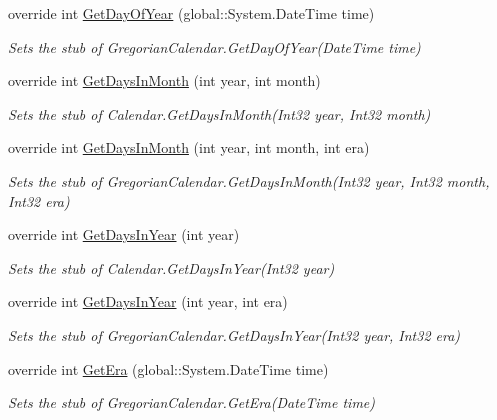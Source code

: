 \begin{DoxyCompactItemize}
override int \hyperlink{class_system_1_1_globalization_1_1_fakes_1_1_stub_gregorian_calendar_a5362a6812378c108ce867c2d4b1d39f6}{Get\-Day\-Of\-Year} (global\-::\-System.\-Date\-Time time)
\begin{DoxyCompactList}\small\item\em Sets the stub of Gregorian\-Calendar.\-Get\-Day\-Of\-Year(\-Date\-Time time)\end{DoxyCompactList}\item 
override int \hyperlink{class_system_1_1_globalization_1_1_fakes_1_1_stub_gregorian_calendar_a2834076f6f98516bada15338f945bf37}{Get\-Days\-In\-Month} (int year, int month)
\begin{DoxyCompactList}\small\item\em Sets the stub of Calendar.\-Get\-Days\-In\-Month(\-Int32 year, Int32 month)\end{DoxyCompactList}\item 
override int \hyperlink{class_system_1_1_globalization_1_1_fakes_1_1_stub_gregorian_calendar_ac8bd5afc61ce5db1c7bc67a56047295b}{Get\-Days\-In\-Month} (int year, int month, int era)
\begin{DoxyCompactList}\small\item\em Sets the stub of Gregorian\-Calendar.\-Get\-Days\-In\-Month(\-Int32 year, Int32 month, Int32 era)\end{DoxyCompactList}\item 
override int \hyperlink{class_system_1_1_globalization_1_1_fakes_1_1_stub_gregorian_calendar_a02b9bdddf05fb298c472f6e54b7bb572}{Get\-Days\-In\-Year} (int year)
\begin{DoxyCompactList}\small\item\em Sets the stub of Calendar.\-Get\-Days\-In\-Year(\-Int32 year)\end{DoxyCompactList}\item 
override int \hyperlink{class_system_1_1_globalization_1_1_fakes_1_1_stub_gregorian_calendar_a43bbb4b7bd1474f1b28de0a82b5362a3}{Get\-Days\-In\-Year} (int year, int era)
\begin{DoxyCompactList}\small\item\em Sets the stub of Gregorian\-Calendar.\-Get\-Days\-In\-Year(\-Int32 year, Int32 era)\end{DoxyCompactList}\item 
override int \hyperlink{class_system_1_1_globalization_1_1_fakes_1_1_stub_gregorian_calendar_aa3712338b0019f495537b4208f160595}{Get\-Era} (global\-::\-System.\-Date\-Time time)
\begin{DoxyCompactList}\small\item\em Sets the stub of Gregorian\-Calendar.\-Get\-Era(\-Date\-Time time)\end{DoxyCompactList}\item 

\end{DoxyCompactItemize}
